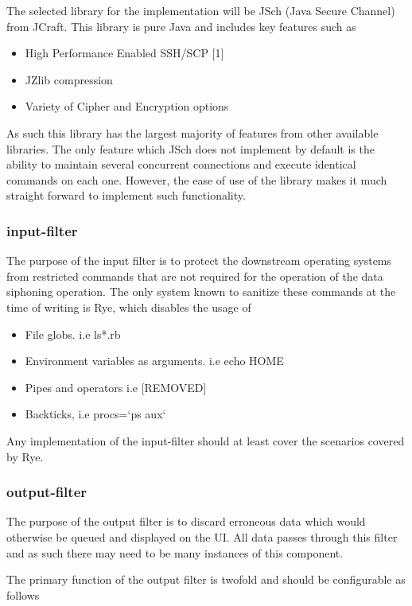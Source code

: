 \documentclass{llncs}
\begin{document}
The selected library for the implementation will be JSch (Java Secure Channel) from JCraft. This library is pure Java and includes key features such as

\begin{itemize}
\item	High Performance Enabled SSH/SCP [1]
\item	JZlib compression
\item	Variety of Cipher and Encryption options
\end{itemize}
As such this library has the largest majority of features from other available libraries. The only feature which JSch does not implement by default is the ability to maintain several concurrent connections and execute identical commands on each one. However, the ease of use of the library makes it much straight forward to implement such functionality.

\subsubsection{input-filter}
	
The purpose of the input filter is to protect the downstream operating systems from restricted commands that are not required for the operation of the data siphoning operation. The only system known to sanitize these commands at the time of writing is Rye, which disables the usage of

\begin{itemize}
\item	File globs. i.e ls*.rb
\item	Environment variables as arguments. i.e echo HOME
\item	Pipes and operators i.e  [REMOVED]
\item	Backticks, i.e procs=`ps aux`
\end{itemize}

Any implementation of the input-filter should at least cover the scenarios covered by Rye. 

\subsubsection{ output-filter}
	
The purpose of the output filter is to discard erroneous data which would otherwise be queued and displayed on the UI. All data passes through this filter and as such there may need to be many instances of this component.

The primary function of the output filter is twofold and should be configurable as follows
\end{document}
